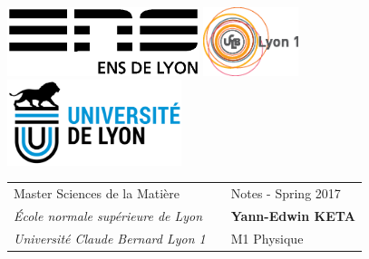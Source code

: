 \documentclass[class=report, float=false, crop=false]{standalone}
\begin{document}
\thispagestyle{empty}

\includegraphics[height=2cm]{logoens.eps} \hfill \includegraphics[height=2cm]{logoucbl.eps} \hfill \includegraphics[height=2.5cm]{udl-logo.png}

\vspace{0.5cm}

\begin{tabularx}{\textwidth}{ @{} l X l @{} }
{\sc Master Sciences de la Matière} & & Notes - Spring 2017 \\
{\it École normale supérieure de Lyon} & & \textbf{Yann-Edwin KETA} \\
{\it Université Claude Bernard Lyon 1} & & M1 Physique
\end{tabularx}
\end{document}
